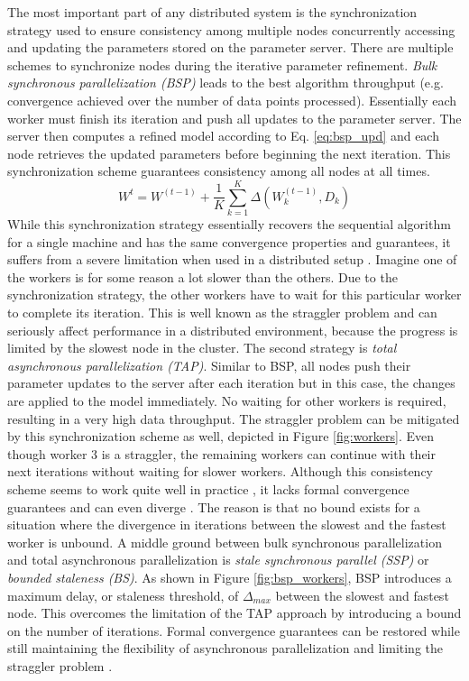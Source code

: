 The most important part of any distributed system is the synchronization strategy used to ensure consistency among multiple nodes concurrently accessing and updating the parameters stored on the parameter server. There are multiple schemes to synchronize nodes during the iterative parameter refinement. \textit{Bulk synchronous parallelization (BSP)} leads to the best algorithm throughput (e.g. convergence achieved over the number of data points processed). Essentially each worker must finish its iteration and push all updates to the parameter server. The server then computes a refined model according to Eq. \ref{eq:bsp_upd} and each node retrieves the updated parameters before beginning the next iteration. This synchronization scheme guarantees consistency among all nodes at all times.
\begin{equation}
W^{t} = W^{(t-1)} + \frac{1}{K}\sum_{k=1}^{K}\Delta(W^{(t-1)}_{k}, D_{k})
\label{eq:bsp_upd}
\end{equation}
While this synchronization strategy essentially recovers the sequential algorithm for a single machine and has the same convergence properties and guarantees, it suffers from a severe limitation when used in a distributed setup \cite{langford2009slow}. Imagine one of the workers is for some reason a lot slower than the others. Due to the synchronization strategy, the other workers have to wait for this particular worker to complete its iteration. This is well known as the straggler problem \cite{ananthanarayanan2013effective} and can seriously affect performance in a distributed environment, because the progress is limited by the slowest node in the cluster.
The second strategy is \textit{total asynchronous parallelization (TAP)}. Similar to BSP, all nodes push their parameter updates to the server after each iteration but in this case, the changes are applied to the model immediately. No waiting for other workers is required, resulting in a very high data throughput. The straggler problem can be mitigated by this synchronization scheme as well, depicted in Figure \ref{fig:workers}. Even though worker 3 is a straggler, the remaining workers can continue with their next iterations without waiting for slower workers. Although this consistency scheme seems to work quite well in practice \cite{li2014scaling}, it lacks formal convergence guarantees and can even diverge \cite{dai2014high}. The reason is that no bound exists for a situation where the divergence in iterations between the slowest and the fastest worker is unbound.
A middle ground between bulk synchronous parallelization and total asynchronous parallelization is \textit{stale synchronous parallel (SSP)} \cite{ho2013more} or \textit{bounded staleness (BS)}. As shown in Figure \ref{fig:bsp_workers}, BSP introduces a maximum delay, or staleness threshold, of $\Delta_{max}$ between the slowest and fastest node. This overcomes the limitation of the TAP approach by introducing a bound on the number of iterations. Formal convergence guarantees can be restored while still maintaining the flexibility of asynchronous parallelization and limiting the straggler problem \cite{cipar2013solving}.
